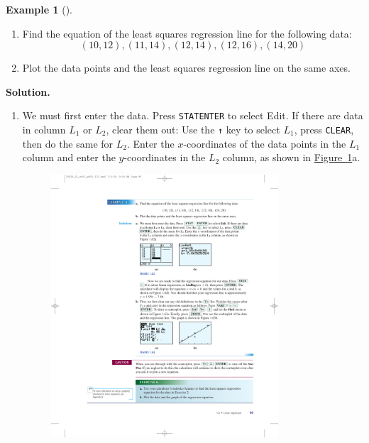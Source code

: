 \documentclass[10pt,]{book}
\theoremstyle{plain}
\theoremstyle{definition}
\theoremstyle{definition}
\theoremstyle{definition}
\newtheorem{example}[theorem]{Example}
\theoremstyle{definition}
\theoremstyle{definition}
\numberwithin{equation}{section}
\begin{document}
\begin{example}[]\label{example-GC-regression}
\leavevmode%
\begin{enumerate}[label=*\alph**]
\item\hypertarget{li-212}{}Find the equation of the least squares regression line for the following data:
            \begin{equation*}(10, 12), (11, 14), (12, 14), (12, 16), (14, 20)\end{equation*}\item\hypertarget{li-213}{}Plot the data points and the least squares regression line on the same axes.\end{enumerate}
\par\medskip\noindent%
\textbf{Solution.}\quad \leavevmode%
\begin{enumerate}[label=*\alph**]
\item\hypertarget{li-214}{}We must first enter the data. Press \lstinline?STAT?\lstinline?ENTER? to select Edit. If there are data in column \(L_1\) or \(L_2\), clear them out: Use the \lstinline?↑? key to select \(L_1\), press \lstinline?CLEAR?, then do the same for \(L_2\). Enter the \(x\)-coordinates of the data points in the \(L_1\) column and enter the \(y\)-coordinates in the \(L_2\) column, as shown in \hyperref[fig-GC-regression]{Figure~\ref{fig-GC-regression}}a.
        \leavevmode%
\begin{figure}
\centering
\includegraphics[width=0.80\textwidth,]{images/fig-GC-regression.pdf}\caption{\label{fig-GC-regression}}
\end{figure}


\end{enumerate}
\end{example}
\end{document}
